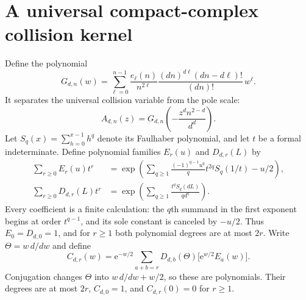 \documentclass[11pt,a4paper]{article}
\theoremstyle{definition}\newtheorem{definition}[theorem]{Definition}
\theoremstyle{remark}\newtheorem{remark}[theorem]{Remark}
\newcommand{\e}{\mathrm e}
\begin{document}
\section{A universal compact-complex collision kernel}
\label{otr:sec:kernel}
Define the polynomial
\begin{equation}\label{otr:eq:G}
 G_{d,n}(w)=\sum_{\ell=0}^{n-1}
 \frac{e_\ell(n)}{n^{2\ell}}
 \frac{(dn)^{d\ell}(dn-d\ell)!}{(dn)!}\,w^\ell.
\end{equation}
It separates the universal collision variable from the pole scale:
\begin{equation}\label{otr:eq:AfromG}
 A_{d,n}(z)=G_{d,n}\left(-\frac{z^d n^{2-d}}{d^d}\right).
\end{equation}
Let $S_q(x)=\sum_{h=0}^{x-1}h^q$ denote its Faulhaber polynomial, and let $t$ be a formal indeterminate. Define polynomial families $E_r(u)$ and $D_{d,r}(L)$ by
\begin{align}
 \sum_{r\ge0}E_r(u)t^r
 &=\exp\left(\sum_{q\ge1}\frac{(-1)^{q-1}u^q}{q}
                        t^{2q}S_q(1/t)-u/2\right),\label{otr:eq:E}\\
 \sum_{r\ge0}D_{d,r}(L)t^r
 &=\exp\left(\sum_{q\ge1}\frac{t^qS_q(dL)}{q d^q}\right).
 \label{otr:eq:D}
\end{align}
Every coefficient is a finite calculation: the $q$th summand in the first exponent begins at order $t^{q-1}$, and its sole constant is canceled by $-u/2$. Thus $E_0=D_{d,0}=1$, and for $r\ge1$ both polynomial degrees are at most $2r$. Write $\Theta=w\,d/dw$ and define
\begin{equation}\label{otr:eq:C}
 C_{d,r}(w)=\e^{-w/2}\sum_{a+b=r}
     D_{d,b}(\Theta)\bigl[\e^{w/2}E_a(w)\bigr].
\end{equation}
Conjugation changes $\Theta$ into $w\,d/dw+w/2$, so these are polynomials. Their degrees are at most $2r$, $C_{d,0}=1$, and $C_{d,r}(0)=0$ for $r\ge1$.
\end{document}
